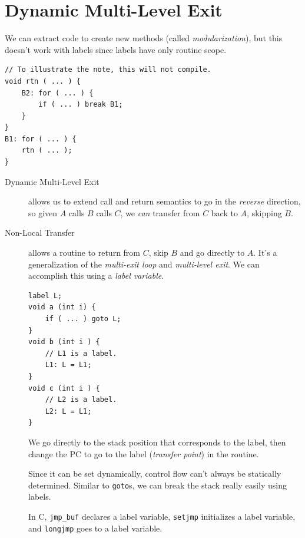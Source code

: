         \section{Dynamic Multi-Level Exit} %
        \label{sec:dynamic_multi_level_exit}
            We can extract code to create new methods (called \emph{modularization}), but this doesn't work with labels since labels have only routine scope.
            \begin{lstlisting}
// To illustrate the note, this will not compile.
void rtn ( ... ) {
    B2: for ( ... ) {
        if ( ... ) break B1;
    }
}
B1: for ( ... ) {
    rtn ( ... );
}
            \end{lstlisting}
            \begin{description}
                \item[Dynamic Multi-Level Exit] allows us to extend call and return semantics to go in the \emph{reverse} direction, so given $A$ calls $B$ calls $C$, we \emph{can} transfer from $C$ back to $A$, skipping $B$.
                \item[Non-Local Transfer] allows a routine to return from $C$, skip $B$ and go directly to $A$.
                It's a generalization of the \emph{multi-exit loop} and \emph{multi-level exit}.
                We can accomplish this using a \emph{label variable}.
                \begin{lstlisting}
label L;
void a (int i) {
    if ( ... ) goto L;
}
void b (int i ) {
    // L1 is a label.
    L1: L = L1;
}
void c (int i ) {
    // L2 is a label.
    L2: L = L1;
}
                \end{lstlisting}
                We go directly to the stack position that corresponds to the label, then change the PC to go to the label (\emph{transfer point}) in the routine.

                Since it can be set dynamically, control flow can't always be statically determined.
                Similar to \verb|goto|s, we can break the stack really easily using labels.

                In \textsc{C}, \verb|jmp_buf| declares a label variable, \verb|setjmp| initializes a label variable, and \verb|longjmp| goes to a label variable.
            \end{description}

